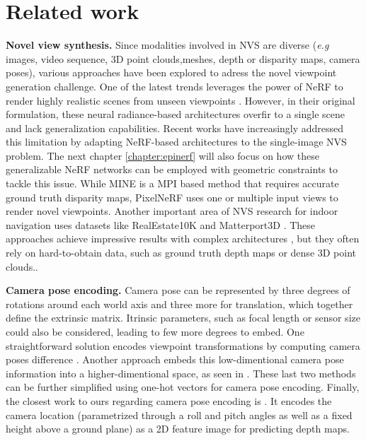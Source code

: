 \section{Related work}

\noindent\textbf{Novel view synthesis.} Since modalities involved in \ac{NVS} are diverse (\textit{e.g} images, video sequence, 3D point clouds,meshes, depth or disparity maps, camera poses), various approaches have been explored to adress the novel viewpoint generation challenge. One of the latest trends leverages the power of \ac{NeRF} \citep{mildenhall2020nerf} to render highly realistic scenes from unseen viewpoints \citep{wang2021neus,niemeyer2022regnerf,barron2022mip}. However, in their original formulation, these neural radiance-based  architectures overfir to a single scene and lack generalization capabilities. Recent works \citep{yu2021pixelnerf,li2021mine} have increasingly addressed this limitation by adapting NeRF-based architectures to the single-image \ac{NVS} problem. The next chapter \ref{chapter:epinerf} will also focus on how these generalizable \ac{NeRF} networks can be employed with geometric constraints to tackle this issue. While MINE \citep{li2021mine} is a \ac{MPI} based method that requires accurate ground truth disparity maps, PixelNeRF \citep{yu2021pixelnerf} uses one or multiple input views to render novel viewpoints. Another important area of \ac{NVS} research for indoor navigation uses datasets like RealEstate10K \citep{zhou2018stereo} and Matterport3D \citep{zhao2021camera}. These approaches achieve impressive results with complex architectures \citep{wiles2020synsin,rombach2021geometry,rockwell2021pixelsynth}, but they often rely on hard-to-obtain data, such as ground truth depth maps or dense 3D point clouds.. \newline

\noindent\textbf{Camera pose encoding.} Camera pose can be represented by three degrees of rotations around each world axis and three more for translation, which together define the extrinsic matrix.  Itrinsic parameters, such as focal length or sensor size could also be considered, leading to few more degrees to embed. One straightforward solution encodes viewpoint transformations by computing camera poses difference \citep{sun2018multiview}. Another approach embeds this low-dimentional camera pose information into a higher-dimentional space, as seen in \citep{kim2020novel,rombach2021geometry}. These last two methods can be further simplified using one-hot vectors for camera pose encoding. Finally, the closest work to ours regarding camera pose encoding is \citep{zhao2021camera}. It encodes the camera location (parametrized through a roll and pitch angles as well as a fixed height above a ground plane) as a 2D feature image for predicting depth maps. \newline

